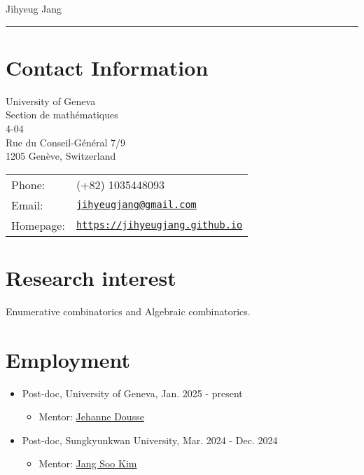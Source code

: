 \documentclass[letterpaper]{article}
\def\name{Jihyeug Jang}
\begin{document}
{\huge \name}


\vspace{0.2in}

\noindent\rule{\textwidth}{1pt}

\section*{Contact Information}
\begin{minipage}{0.45\linewidth}
  University of Geneva \\
  Section de mathématiques \\
  4-04 \\
  Rue du Conseil-Général 7/9 \\
  1205 Genève, Switzerland
\end{minipage}
\begin{minipage}{0.45\linewidth}
  \begin{tabular}{ll}
    Phone: & (+82) 1035448093 \\
    Email: & \href{mailto:jihyeugjang@gmail.com}{\tt jihyeugjang@gmail.com} \\
    Homepage: & \href{https://jihyeugjang.github.io}{\tt https://jihyeugjang.github.io} \\
  \end{tabular}
\end{minipage}


\section*{Research interest}

Enumerative combinatorics and Algebraic combinatorics.

\section*{Employment}
\begin{itemize}
\item Post-doc, University of Geneva, Jan. 2025 - present
    \begin{itemize}
    \item Mentor: \href{https://www.unige.ch/~doussej/}{Jehanne Dousse}
    \end{itemize}
\item Post-doc, Sungkyunkwan University, Mar. 2024 - Dec. 2024
    \begin{itemize}
    \item Mentor: \href{https://jangsookim.github.io/}{Jang Soo Kim}
    \end{itemize}
\end{itemize}
\end{document}
